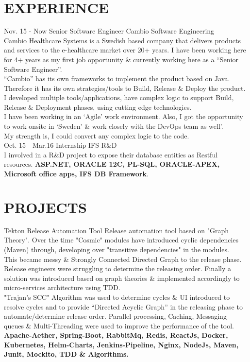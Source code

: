 \documentclass[]{cv-class}
\begin{document}
\section{EXPERIENCE}
\begin{entrylist}
  \entry
    {Nov. 15 - Now}
    {Senior Software Engineer}
    {Cambio Software Engineering}
    {   \\
        Cambio Healthcare Systems is a Swedish based company that delivers products and services to the e-healthcare market over 20+ years.
        I have been working here for 4+ years as my first job opportunity \& currently working here as a “Senior Software Engineer”.
        \\
        “Cambio” has its own frameworks to implement the product based on Java.
        Therefore it has its own strategies/tools to Build, Release \& Deploy the product.
        I developed multiple tools/applications, have complex logic to support Build, Release \& Deployment phases, using cutting edge technologies.
        \\
        I have been working in an ‘Agile’ work environment.
        Also, I got the opportunity to work onsite in ‘Sweden’ \& work closely with the DevOps team as well’.
        \\
        My strength is, I could convert any complex logic to the code.
    }
\\
  \entry
    {Oct. 15 - Mar.16}
    {Internship}
    {IFS R\&D}
    {   \\
        I involved in a R\&D project to expose their database entities as Restful resources.
        \textbf{ASP.NET, ORACLE 12C, PL-SQL, ORACLE-APEX, Microsoft office apps, IFS DB Framework}.
    }
\end{entrylist}

\section{PROJECTS}
\begin{entrylist}
    \entry
    {}
	{Tekton}
    {Release Automation Tool}
	{Release automation tool based on "Graph Theory". Over the time "Cosmic" modules have introduced cyclic dependencies (Maven) through, developing over "transitive dependencies" in the modules.
	\\
	This became messy \& Strongly Connected Directed Graph to the release phase. Release engineers were struggling to determine the releasing order. Finally a solution was introduced based on graph theories \& implemented accordingly to micro-services architecture using TDD.
	\\
	"Trajan’s SCC" Algorithm was used to determine cycles \& UI introduced to resolve cycles and to provide “Directed Acyclic Graph”
	in the releasing phase to automate/determine release order.
	Parallel processing, Caching, Messaging queues \& Multi-Threading were used to improve the performance of the tool.
	\\
    \textbf{Apache-Aether, Spring-Boot, RabbitMq, Redis, ReactJs, Docker, Kubernetes, Helm-Charts, Jenkins-Pipeline, Nginx, NodeJs, Maven, Junit, Mockito, TDD \& Algorithms.}
	}
	\\
	\end{entrylist}
\end{document}
